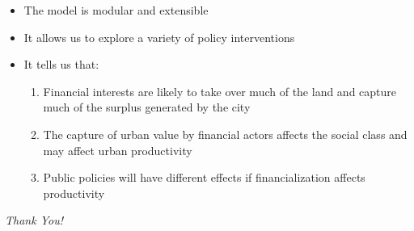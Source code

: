 \documentclass[]{beamer} %
\begin{document}
\begin{frame}{} 

\begin{itemize} \Large
\item The model is modular and extensible
\item It allows us to explore a variety of policy interventions 
\item It tells us that: 
\begin{enumerate}
    \item Financial interests are likely to take over much of the land and capture much of the surplus generated by the city
    \item The capture of urban value by financial actors affects the social class and may affect urban productivity
    \item Public policies will have different effects if financialization affects productivity
    \end{enumerate}
\end{itemize}
\end{frame}
\begin{frame}
  \centering \Large
  \emph{Thank You!}
\end{frame}
\end{document}
